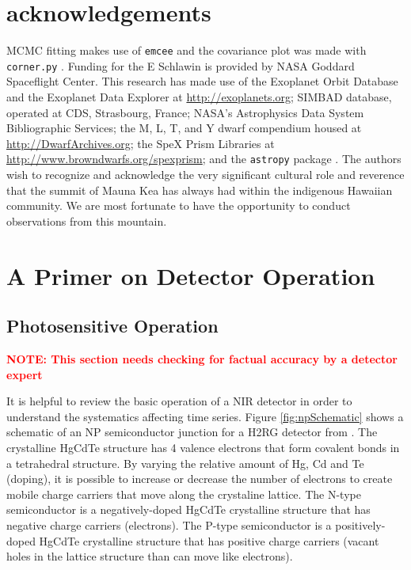 \documentclass{aastex62}
\begin{document}
\acknowledgments

\section*{acknowledgements}
MCMC fitting makes use of \texttt{emcee} \citep{foreman-mackey2013emcee} and the covariance plot was made with \texttt{corner.py} \citep{foremanCorner}.
Funding for the E Schlawin is provided by NASA Goddard Spaceflight Center.
This research has made
use of the Exoplanet Orbit Database and the Exoplanet Data Explorer at \url{http://exoplanets.org}; SIMBAD database, operated at CDS, Strasbourg,
France; NASA's Astrophysics Data System Bibliographic
Services; the M, L, T, and Y dwarf compendium
housed at \url{http://DwarfArchives.org}; the SpeX Prism
Libraries at \url{http://www.browndwarfs.org/spexprism}; and the \texttt{astropy} package \citep{astropy2013}. 
The authors wish to recognize and acknowledge the very significant cultural role and reverence that the summit of Mauna Kea has always had within the indigenous Hawaiian community. We are most fortunate to have the opportunity to conduct observations from this mountain.

\appendix


\section{A Primer on Detector Operation}\label{sec:detectorPrimer}

\subsection{Photosensitive Operation}
\textcolor{red}{\textbf{NOTE: This section needs checking for factual accuracy by a detector expert}}

It is helpful to review the basic operation of a NIR detector \citep[e.g.][]{rieke2007irDetectorReview} in order to understand the systematics affecting time series.
Figure \ref{fig:npSchematic} shows a schematic of an NP semiconductor junction for a H2RG detector from \citet{smith2008imgPersistence}.
The crystalline HgCdTe structure has 4 valence electrons that form covalent bonds in a tetrahedral structure.
By varying the relative amount of Hg, Cd and Te (doping), it is possible to increase or decrease the number of electrons to create mobile charge carriers that move along the crystaline lattice.
The N-type semiconductor is a negatively-doped HgCdTe crystalline structure that has negative charge carriers (electrons).
The P-type semiconductor is a positively-doped HgCdTe crystalline structure that has positive charge carriers (vacant holes in the lattice structure than can move like electrons).
\end{document}
